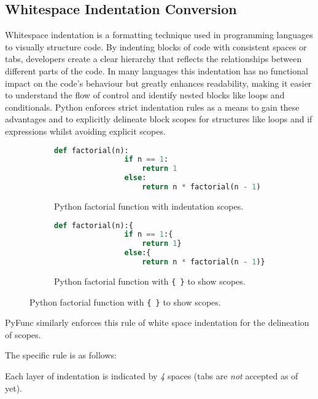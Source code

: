 \documentclass{l4proj}
\begin{document}
\subsection{Whitespace Indentation Conversion}

Whitespace indentation is a formatting technique used in programming languages to visually structure code.
By indenting blocks of code with consistent spaces or tabs, developers create a clear hierarchy that reflects the relationships between different parts of the code.
In many languages this indentation has no functional impact on the code's behaviour but greatly enhances readability, making it easier to understand the flow of control and identify nested blocks like loops and conditionals.
Python enforces strict indentation rules as a means to gain these advantages and to explicitly delineate block scopes for structures like loops and if expressions whilst avoiding explicit scopes.

\begin{figure}[h]
    \centering
    \begin{subfigure}[b]{0.45\textwidth}
        \begin{lstlisting}[language=Python]
            def factorial(n):
                if n == 1:
                    return 1
                else:
                    return n * factorial(n - 1)
        \end{lstlisting}
        \caption{Python factorial function with indentation scopes.}
    \end{subfigure}
    \hfill
    \begin{subfigure}[b]{0.45\textwidth}
        
        \begin{lstlisting}[language=Python]
            def factorial(n):{
                if n == 1:{
                    return 1}
                else:{
                    return n * factorial(n - 1)}}
        \end{lstlisting}
        \caption{Python factorial function with \texttt{\{ \}} to show scopes.}
    \end{subfigure} 
\end{figure}

PyFunc similarly enforces this rule of white space indentation for the delineation of scopes.

The specific rule is as follows:

\begin{center}
Each layer of indentation is indicated by \emph{4} spaces (tabs are \emph{not} accepted as of yet).
\end{center}
\end{document}
